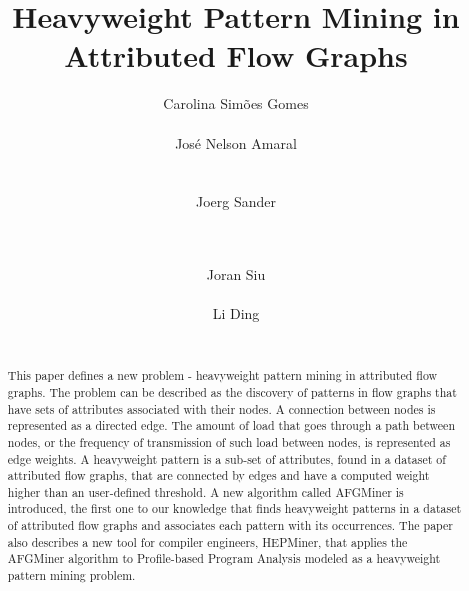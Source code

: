 \documentclass{acm_proc_article-sp}
\begin{document}
\title{Heavyweight Pattern Mining in Attributed Flow Graphs} 
\
\author{
\alignauthor
Carolina Sim\~oes Gomes\\
       \\
\alignauthor
Jos\'e Nelson Amaral\\
       \\
       \\
\alignauthor
Joerg Sander\\
       \\
       \\
\and
\alignauthor 
Joran Siu\\
       \\
\alignauthor 
Li Ding\\
       \\
}

\maketitle
\begin{abstract}
This paper defines a new problem - heavyweight pattern mining in attributed flow graphs. The problem can be described as the discovery of patterns in flow graphs that have sets of attributes associated with their nodes. A connection between nodes is represented as a directed edge. The amount of load that goes through a path between nodes, or the frequency of transmission of such load between nodes, is represented as edge weights. A heavyweight pattern is a sub-set of attributes, found in a dataset of attributed flow graphs, that are connected by edges and have a computed weight higher than an user-defined threshold. A new algorithm called AFGMiner is introduced, the first one to our knowledge that finds heavyweight patterns in a dataset of attributed flow graphs and associates each pattern with its occurrences. The paper also describes a new tool for compiler engineers, HEPMiner, that applies the AFGMiner algorithm to Profile-based Program Analysis modeled as a heavyweight pattern mining problem.
\end{abstract}
\end{document}
